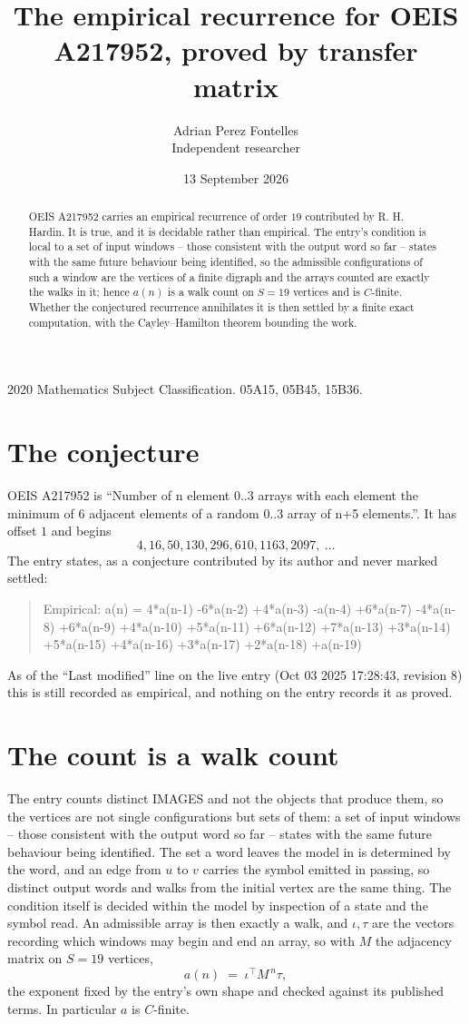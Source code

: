 \documentclass[11pt,a4paper]{article}
\title{The empirical recurrence for OEIS A217952, proved by transfer matrix}
\author{Adrian Perez Fontelles\\ \small Independent researcher}
\date{13 September 2026}
\theoremstyle{plain}
\theoremstyle{definition}
\begin{document}
\maketitle

\begin{abstract}
OEIS A217952 carries an empirical recurrence of order $19$ contributed by R. H. Hardin. It is
true, and it is decidable rather than empirical. The entry's condition is local to a set of input windows -- those consistent with the output word so far -- states with the same future behaviour being identified, so
the admissible configurations of such a window are the vertices of a finite digraph and the
arrays counted are exactly the walks in it; hence $a(n)$ is a walk count on $S=19$ vertices
and is $C$-finite. Whether the conjectured recurrence annihilates it is then settled by a
finite exact computation, with the Cayley--Hamilton theorem bounding the work.
\end{abstract}

\noindent\small 2020 Mathematics Subject Classification. 05A15, 05B45, 15B36.\normalsize

\section{The conjecture}

OEIS A217952 is ``Number of n element 0..3 arrays with each element the minimum of 6 adjacent elements of a random 0..3 array of n+5 elements.''. It has offset $1$ and begins
\[
4, 16, 50, 130, 296, 610, 1163, 2097,\ \dots
\]
The entry states, as a conjecture contributed by its author and never marked settled:
\begin{quote}
Empirical: a(n) = 4*a(n-1) -6*a(n-2) +4*a(n-3) -a(n-4) +6*a(n-7) -4*a(n-8) +6*a(n-9) +4*a(n-10) +5*a(n-11) +6*a(n-12) +7*a(n-13) +3*a(n-14) +5*a(n-15) +4*a(n-16) +3*a(n-17) +2*a(n-18) +a(n-19)
\end{quote}
As of the ``Last modified'' line on the live entry (Oct 03 2025 17:28:43, revision 8) this is still
recorded as empirical, and nothing on the entry records it as proved.

\section{The count is a walk count}

The entry counts distinct IMAGES and not the objects that produce them, so the vertices are not single configurations but sets of them: a set of input windows -- those consistent with the output word so far -- states with the same future behaviour being identified. The set a word leaves the model in is determined by the word, and an edge from $u$ to $v$ carries the symbol emitted in passing, so distinct output words and walks from the initial vertex are the same thing. The condition itself is decided within the model by inspection of a state and the symbol read.
An admissible array is then exactly a walk, and $\iota,\tau$ are the vectors recording which windows may begin and end an array, so with $M$ the adjacency matrix on $S=19$ vertices,
\[
a(n)\;=\;\iota^{\!\top}M^{\,n}\tau ,
\]
the exponent fixed by the entry's own shape and checked against its published terms. In
particular $a$ is $C$-finite.
\end{document}
